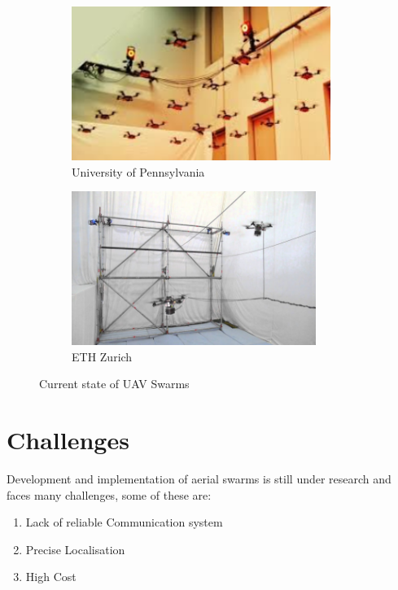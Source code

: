 \begin{spacing}{2}
\begin{figure}[h]
 \begin{subfigure}{0.5\textwidth}
\includegraphics[width=0.9\linewidth, height=5cm]{image/upenn.png}
\caption{University of Pennsylvania}
\end{subfigure}
\begin{subfigure}{0.5\textwidth}
\includegraphics[width=0.9\linewidth, height=5cm]{image/ETH.png}
\caption{ETH Zurich}
\end{subfigure}

\caption{Current state of UAV Swarms}
\label{fig:currstate}
\end{figure}

\section{Challenges}
Development and implementation of aerial swarms is still under research and faces many challenges, some of these are:
\begin{enumerate}
    \item Lack of reliable Communication system
    \item Precise Localisation
    \item High Cost
\end{enumerate}
\end{spacing}